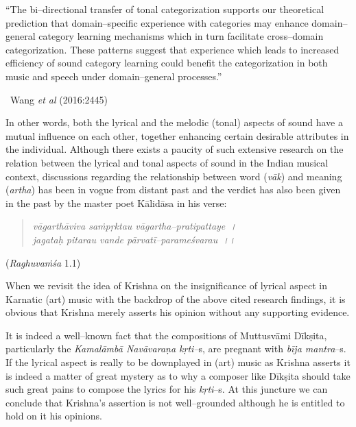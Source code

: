 \begin{myquote}
“The bi–directional transfer of tonal categorization supports our theoretical prediction that domain–specific experience with categories may enhance domain–general category learning mechanisms which in turn facilitate cross–domain categorization. These patterns suggest that experience which leads to increased efficiency of sound category learning could benefit the categorization in both music and speech under domain–general processes.” 

~\hfill Wang \textit{et al} (2016:2445)
\end{myquote}

In other words, both the lyrical and the melodic (tonal) aspects of sound have a mutual influence on each other, together enhancing certain desirable attributes in the individual. Although there exists a paucity of such extensive research on the relation between the lyrical and tonal aspects of sound in the Indian musical context, discussions regarding the relationship between word (\textit{vāk}) and meaning (\textit{artha}) has been in vogue from distant past and the verdict has also been given in the past by the master poet Kālidāsa in his verse:

\begin{verse}
\textit{vāgarthāviva saṁpṛktau vāgartha–pratipattaye~। }\\\textit{jagataḥ pitarau vande pārvatī–parameśvarau~।।}
\end{verse}

\begin{flushright}
(\textit{Raghuvaṁśa} 1.1)
\end{flushright}

When we revisit the idea of Krishna on the insignificance of lyrical aspect in Karnatic (art) music with the backdrop of the above cited research findings, it is obvious that Krishna merely asserts his opinion without any supporting evidence.

It is indeed a well–known fact that the compositions of Muttusvāmi Dīkṣita, particularly the \textit{Kamalāmbā Navāvaraṇa kṛti–}s, are pregnant with \textit{bīja mantra}–s. If the lyrical aspect is really to be downplayed in (art) music as Krishna asserts it is indeed a matter of great mystery as to why a composer like Dīkṣita should take such great pains to compose the lyrics for his \textit{kṛti}–s. At this juncture we can conclude that Krishna’s assertion is not well–grounded although he is entitled to hold on it his opinions.

